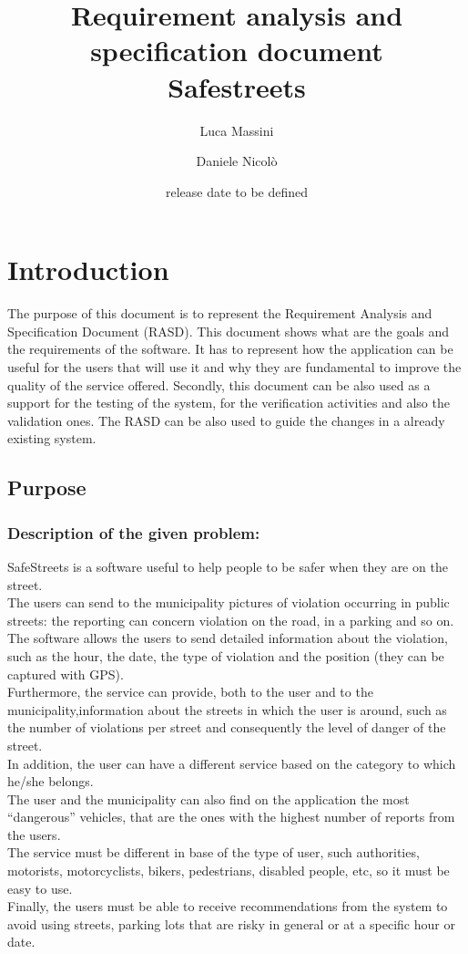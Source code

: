 \documentclass[titlepage]{article}
\author{Luca Massini \and Daniele Nicolò}
\title{Requirement analysis and specification document
\\ Safestreets}
\date{release date to be defined}
\begin{document}
\maketitle
\newpage 
\tableofcontents
\newpage

\section{Introduction}
The purpose of this document is to represent the Requirement Analysis and Specification Document (RASD).
This document shows what are the goals and the requirements of the software.
It has to represent how the application can be useful for the users that will use it and why they are fundamental to improve the quality of the service offered. Secondly, this document can be also used as a support for the testing of the system, for the verification activities and also the validation ones. The RASD can be also used to guide the changes in a already existing system.
\subsection{Purpose}

\subsubsection{Description of the given problem:}
SafeStreets is a software useful to help people to be safer when they are on the street.\\
The users can send to the municipality pictures of violation occurring in public streets: the reporting can concern violation on the road, in a parking and so on.\\
The software allows the users to send detailed information about the violation, such as the hour, the date, the type of violation and the position (they can be captured with GPS).\\
Furthermore, the service can provide, both to the user and to the municipality,information about the streets in which the user is around,
such as the number of violations per street and consequently the level of danger of the street.\\
In addition, the user can have a different service based on the category to which he/she belongs.\\
The user and the municipality can also find on the application the most “dangerous” vehicles, that are the ones with the highest number of reports from the users.\\
The service must be different in base of the type of user, such  authorities, motorists, motorcyclists, bikers, pedestrians, disabled people, etc, so it must be easy to use.\\
Finally, the users must be able to receive recommendations from the system to avoid using streets, parking lots that are risky in general or at a specific hour or date.\\
\end{document}
